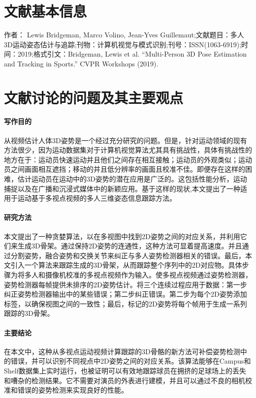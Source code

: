 \documentclass[a4paper,12pt,onecolumn,songti]{article}
\begin{document}
 
	\section{文献基本信息}
	作者： Lewis Bridgeman, Marco Volino, Jean-Yves Guillemaut;文献题目：多人3D运动姿态估计与追踪;刊物：计算机视觉与模式识别;刊号：ISSN(1063-6919);时间：2019;格式引文：Bridgeman, Lewis et al. “Multi-Person 3D Pose Estimation and Tracking in Sports.” CVPR Workshops (2019).
	\section{文献讨论的问题及其主要观点}
		\paragraph{写作目的}
		从视频估计人体3D姿势是一个经过充分研究的问题。但是，针对运动领域的现有方法很少，因为运动数据集对于计算机视觉算法尤其具有挑战性，具体有挑战性的地方在于：运动员快速运动并且他们之间存在相互接触；运动员的外观类似；运动员之间画面相互遮挡；移动的并且低分辨率的画面且校准不佳。即便存在这样的困难，估计运动员在运动中的3D姿势的潜在应用是广泛的。这包括性能分析，运动捕捉以及在广播和沉浸式媒体中的新颖应用。基于这样的现状,本文提出了一种适用于运动基于多视点视频的多人三维姿态信息跟踪方法。
		\paragraph{研究方法}
		本文提出了一种贪婪算法，以在多视图中找到2D姿势之间的对应关系，并利用它们来生成3D骨架。通过保持2D姿势的连通性，这种方法可显着提高速度。并且通过分割姿势，融合姿势和交换关节来纠正与多人姿势检测器相关的错误。最后，本文引入一个算法来跟踪生成的3D骨架，从而跟踪整个序列中的2D对应物。具体步骤为将多人和摄像机校准的多视点视频作为输入。使多视点视频通过姿势检测器，姿势检测器每帧提供未排序的2D姿势估计。将三个连续过程应用于数据：第一步纠正姿势检测器输出中的某些错误；第二步纠正错误。第二步为每个2D姿势添加标签，以确保视图之间的一致性；最后，标记的2D姿势将每个帧用于生成一系列跟踪的3D骨架。
		\paragraph{主要结论}
		在本文中，这种从多视点运动视频计算跟踪的3D骨骼的新方法可补偿姿势检测中的错误，并可以识别不同视点中2D姿势之间的对应关系。该算法能够在Campus和Shelf数据集上实时运行，也被证明可以有效地跟踪球员在拥挤的足球场上的丢失和嘈杂的检测结果。它不需要对演员的外表进行建模，并且可以通过不良的相机校准和错误的姿势检测来实现良好的性能。
\end{document}
